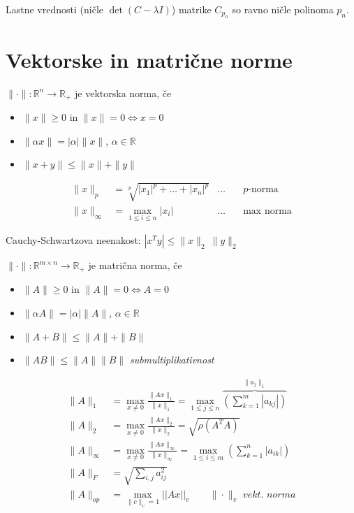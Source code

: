 \begin{multicols}{5}
Lastne vrednosti (ničle $\det(C-\lambda I)$) matrike $C_{p_n}$ so ravno ničle polinoma $p_n$.

\section{Vektorske in matrične norme}
$\|\cdot \| : \mathbb{R}^n \to \mathbb{R}_+$ je vektorska norma, če
\begin{itemize}
	\item $\| x \| \geq 0$ in $\| x \| = 0 \iff x = 0$
	\item $\| \alpha x \| = |\alpha| \| x \|$, $\alpha \in \mathbb{R}$
	\item $\| x + y \| \leq \| x \| + \| y \|$
\end{itemize}

\begin{align*}
	\| x\|_p &= \sqrt[p]{|x_1|^p + \dots + |x_n|^p} & \dots \quad & p\text{-norma} \\
	\| x \|_\infty &= \max\limits_{1 \leq i \leq n} |x_i| & \dots \quad & \text{max norma}
\end{align*}

Cauchy-Schwartzova neenakost: $|x^T y| \leq \|x\|_2\ \|y\|_2$

$\|\cdot \| : \mathbb{R}^{m \times n} \to \mathbb{R}_+$ je matrična norma, če
\begin{itemize}
	\item $\| A \| \geq 0$ in $\| A \| = 0 \iff A = 0$
	\item $\| \alpha A \| = |\alpha| \| A \|$, $\alpha \in \mathbb{R}$
	\item $\| A + B \| \leq \| A \| + \| B \|$
	\item $\| A  B \| \leq \| A \|  \| B \|$ \textit{submultiplikativnost}
\end{itemize}

\begin{align*}
	\| A \|_1 &= \max_{x\neq 0} \frac{\| Ax\|_1}{\|x\|_1} = \max_{1 \leq j \leq n} \overbrace{\left( \sum_{k=1}^m |a_{kj}| \right)}^{\| a_j\|_1}\\
	\| A \|_2 &= \max_{x\neq 0} \frac{\| Ax\|_2}{\|x\|_2} =\sqrt{\rho (A^T A)} \\
	\| A \|_\infty &= \max_{x\neq 0} \frac{\| Ax\|_\infty}{\|x\|_\infty} = \max\limits_{1 \leq i \leq m} \left( \sum_{k=1}^n |a_{ik}| \right) \\
	\| A \|_F &= \sqrt{\sum_{i,j} a_{ij}^2}\\
	\| A \|_{op} &= \max_{\|c\|_v = 1} || A x ||_v \qquad \textit{$\|\cdot \|_v$ vekt. norma}
\end{align*}


\end{multicols}
